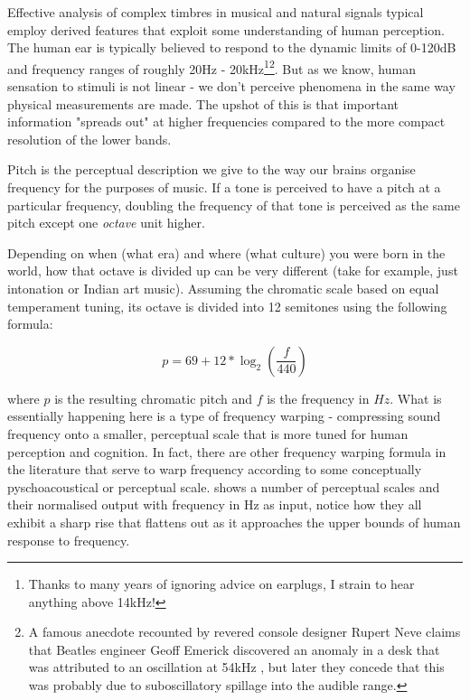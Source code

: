 {{Effective analysis of complex timbres in musical and natural signals typical employ derived features that exploit some understanding of human perception. The human ear is typically believed to respond to the dynamic limits of 0-120dB and frequency ranges of roughly 20Hz - 20kHz\footnote{Thanks to many years of ignoring advice on earplugs, I strain to hear anything above 14kHz!}\footnote{A famous anecdote recounted by revered console designer Rupert Neve claims that Beatles engineer Geoff Emerick discovered an anomaly in a desk that was attributed to an oscillation at 54kHz \citep{Winer2012}, but later they concede that this was probably due to suboscillatory spillage into the audible range.}. But as we know, human sensation to stimuli is not linear - we don't perceive phenomena in the same way physical measurements are made. The upshot of this is that important information "spreads out" at higher frequencies compared to the more compact resolution of the lower bands.

Pitch is the perceptual description we give to the way our brains organise frequency for the purposes of music. If a tone is perceived to have a pitch at a particular frequency, doubling the frequency of that tone is perceived as the same pitch except one \textit{octave} unit higher.

Depending on when (what era) and where (what culture) you were born in the world, how that octave is divided up can be very different (take for example, just intonation or Indian art music). Assuming the chromatic scale based on equal temperament tuning, its octave is divided into 12 semitones using the following formula:

\begin{equation}
\label{eq:pitch}	
p = 69 + 12 * \log_2(\frac{f}{440})
\end{equation}

where $p$ is the resulting chromatic pitch and $f$ is the frequency in $Hz$. What is essentially happening here is a type of frequency warping - compressing sound frequency onto a smaller, perceptual scale that is more tuned for human perception and cognition. In fact, there are other frequency warping formula in the literature that serve to warp frequency according to some conceptually pyschoacoustical or perceptual scale.  shows a number of perceptual scales and their normalised output with frequency in Hz as input, notice how they all exhibit a sharp rise that flattens out as it approaches the upper bounds of human response to frequency.

}}
